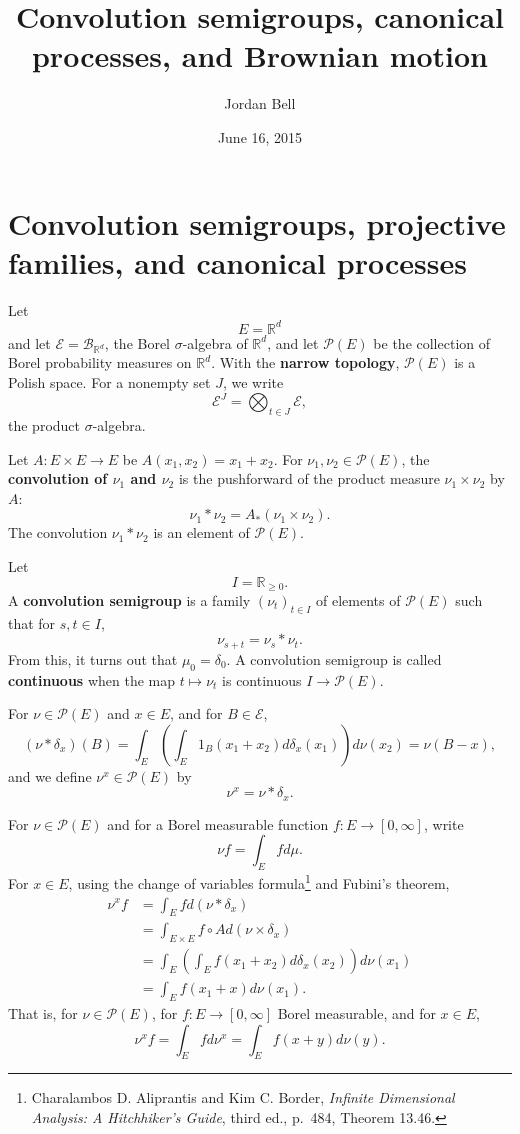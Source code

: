\documentclass{article}
\theoremstyle{definition}
\begin{document}
\title{Convolution semigroups, canonical processes, and Brownian motion}
\author{Jordan Bell}
\date{June 16, 2015}

\maketitle


\section{Convolution semigroups, projective families, and canonical processes}
Let
\[
E=\mathbb{R}^d
\]
and let $\mathscr{E}=\mathscr{B}_{\mathbb{R}^d}$, the Borel $\sigma$-algebra of $\mathbb{R}^d$, and
let $\mathscr{P}(E)$ be the collection of Borel probability measures on $\mathbb{R}^d$. With the \textbf{narrow
topology}, $\mathscr{P}(E)$ is a Polish space.
For a nonempty set $J$, we write
\[
\mathscr{E}^J = \bigotimes_{t \in J} \mathscr{E},
\]
the product $\sigma$-algebra.

Let $A:E \times E \to E$ be $A(x_1,x_2) = x_1+x_2$. For $\nu_1,\nu_2 \in \mathscr{P}(E)$,
the \textbf{convolution of $\nu_1$ and $\nu_2$} is the pushforward of the product measure $\nu_1 \times \nu_2$ 
by $A$:
\[
\nu_1 * \nu_2 = A_*(\nu_1 \times \nu_2).
\]
The convolution $\nu_1 * \nu_2$ is an element of $\mathscr{P}(E)$. 


Let
\[
I=\mathbb{R}_{\geq 0}.
\]
A \textbf{convolution semigroup} is a family $(\nu_t)_{t \in I}$ of elements of $\mathscr{P}(E)$ such that
for $s,t \in I$,
\[
\nu_{s+t} = \nu_s * \nu_t.
\]
From this, it turns out that $\mu_0=\delta_0$.
A convolution semigroup is called \textbf{continuous} when the map $t \mapsto \nu_t$ is continuous $I \to \mathscr{P}(E)$. 

For $\nu \in \mathscr{P}(E)$ and $x \in E$, and for $B \in \mathscr{E}$,
\[
(\nu * \delta_x)(B)
 =
\int_{E} \left( \int_{E} 1_B(x_1+x_2) d\delta_x(x_1) \right) d\nu(x_2) 
=\nu(B-x),
\]
and we define  $\nu^x \in \mathscr{P}(E)$ by
\[
\nu^x = \nu * \delta_x.
\] 

For $\nu \in \mathscr{P}(E)$ and for 
a Borel measurable function $f:E \to [0,\infty]$, write
\[
\nu f = \int_E f d\mu.
\]
For $x \in E$, using the change of variables formula\footnote{Charalambos D. Aliprantis
and Kim C. Border, {\em Infinite Dimensional Analysis: A Hitchhiker's Guide}, third ed., p.~484, Theorem 13.46.}
and Fubini's theorem,
\begin{align*}
\nu^x f &= \int_E f d(\nu*\delta_x)\\
&=\int_{E \times E} f \circ A d(\nu \times \delta_x)\\
&=\int_E \left(\int_E f(x_1+x_2) d\delta_x(x_2) \right) d\nu(x_1)\\
&=\int_E f(x_1+x) d\nu(x_1).
\end{align*}
That is, for $\nu \in \mathscr{P}(E)$, for $f:E \to [0,\infty]$ Borel measurable, and for $x \in E$,
\begin{equation}
\nu^x f = \int_E f d\nu^x = \int_E f(x+y) d\nu(y).
\label{shift}
\end{equation}
\end{document}
